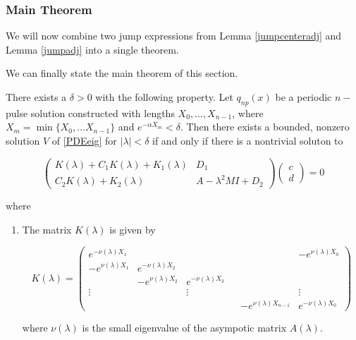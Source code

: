 \documentclass[thesis.tex]{subfiles}
\begin{document}
\subsubsection{Main Theorem}

We will now combine two jump expressions from Lemma \ref{jumpcenteradj} and Lemma \ref{jumpadj} into a single theorem.


We can finally state the main theorem of this section.

\begin{theorem}\label{blockmatrixtheorem}
There exists a $\delta > 0$ with the following property. Let $q_{np}(x)$ be a periodic $n-$pulse solution constructed with lengths $X_0, \dots, X_{n-1}$, where $X_m = \min\{ X_0, \dots X_{n-1}\}$ and $e^{-\alpha X_m} < \delta$. Then there exists a bounded, nonzero solution $V$ of \eqref{PDEeig} for $|\lambda| < \delta$ if and only if there is a nontrivial soluton to

\begin{equation}\label{blockeq}
\begin{pmatrix}
K(\lambda) + C_1 K(\lambda) + K_1(\lambda) & D_1 \\
C_2 K(\lambda) + K_2(\lambda) & A - \lambda^2 MI + D_2
\end{pmatrix}
\begin{pmatrix}c \\ d \end{pmatrix} 
= 0
\end{equation}

where 

\begin{enumerate}

\item The matrix $K(\lambda)$ is given by

\begin{equation}
K(\lambda) = 
\begin{pmatrix}
e^{-\nu(\lambda)X_1} & & & & & -e^{\nu(\lambda)X_0} \\
-e^{\nu(\lambda)X_1} & e^{-\nu(\lambda)X_2} \\
& -e^{\nu(\lambda)X_2} & e^{-\nu(\lambda)X_3} \\
\vdots & & \vdots & &&  \vdots \\
& & & & -e^{\nu(\lambda)X_{n-1}} & e^{-\nu(\lambda)X_0} 
\end{pmatrix}
\end{equation}

where $\nu(\lambda)$ is the small eigenvalue of the asympotic matrix $A(\lambda)$.


\end{enumerate}
\end{theorem}
\end{document}
